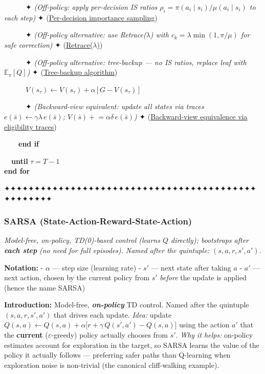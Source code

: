 \documentclass[11pt]{article}
\begin{document}
\begin{pseudobox}
\strut ~~~~~~✦ \emph{(Off-policy: apply per-decision IS ratios
\(\rho_i = \pi(a_i\mid s_i)/\mu(a_i\mid s_i)\) to each step)} ✦
(\hyperref[trick-2-3-4]{Per-decision importance sampling})\\
\strut ~~~~~~✦ \emph{(Off-policy alternative: use Retrace(\(\lambda\))
with \(c_k = \lambda\min(1,\pi/\mu)\) for safe correction)} ✦
(\hyperref[trick-2-3-5]{Retrace(\(\lambda\))})\\
\strut ~~~~~~✦ \emph{(Off-policy alternative: tree-backup --- no IS
ratios, replace leaf with \(\mathbb{E}_\pi[Q]\))} ✦
(\hyperref[trick-2-3-3]{Tree-backup algorithm})\\
\strut ~~~~~~\(V(s_\tau) \leftarrow V(s_\tau) + \alpha\,\bigl[\, G - V(s_\tau) \,\bigr]\)\\
\strut ~~~~~~✦ \emph{(Backward-view equivalent: update all states via
traces \(e(\bar s) \leftarrow \gamma\lambda\,e(\bar s)\);
\(V(\bar s)\mathrel{+}=\alpha\delta\,e(\bar s)\))} ✦
(\hyperref[trick-2-3-2]{Backward-view equivalence via eligibility
traces})\\
\strut ~~~~\textbf{end if}\\
\strut ~~\textbf{until} \(\tau = T - 1\)\\
\textbf{end for}

\end{pseudobox}

    ✦✦✦✦✦✦✦✦✦✦✦✦✦✦✦✦✦✦✦✦✦✦✦✦✦✦✦✦✦✦✦✦✦✦✦✦✦✦✦✦✦✦✦✦✦✦✦✦✦✦

    \clearpage

\label{sarsa}

    \subsubsection{SARSA
(State-Action-Reward-State-Action)}\label{sarsa-state-action-reward-state-action}

    \emph{Model-free, on-policy, TD(0)-based control (learns \(Q\)
directly); bootstraps after} \textbf{\emph{each step}} \emph{(no need
for full episodes).} \emph{Named after the quintuple:
\((s, a, r, s', a')\).}

    \textbf{Notation:} - \(\alpha\) --- step size (learning rate) - \(s'\)
--- next state after taking \(a\) - \(a'\) --- next action, chosen by
the current policy from \(s'\) \emph{before} the update is applied
(hence the name SARSA)

    \label{intro-2-4}

    \textbf{Introduction:} Model-free, \textbf{\emph{on-policy}} TD control.
Named after the quintuple \((s, a, r, s', a')\) that drives each update.
\emph{Idea:} update
\(Q(s,a) \leftarrow Q(s,a) + \alpha\bigl[r + \gamma\, Q(s', a') - Q(s,a)\bigr]\)
using the action \(a'\) that the \textbf{current}
(\(\varepsilon\)-greedy) policy actually chooses from \(s'\). \emph{Why
it helps:} on-policy estimates account for exploration in the target, so
SARSA learns the value of the policy it actually follows --- preferring
safer paths than Q-learning when exploration noise is non-trivial (the
canonical cliff-walking example).
\end{document}
